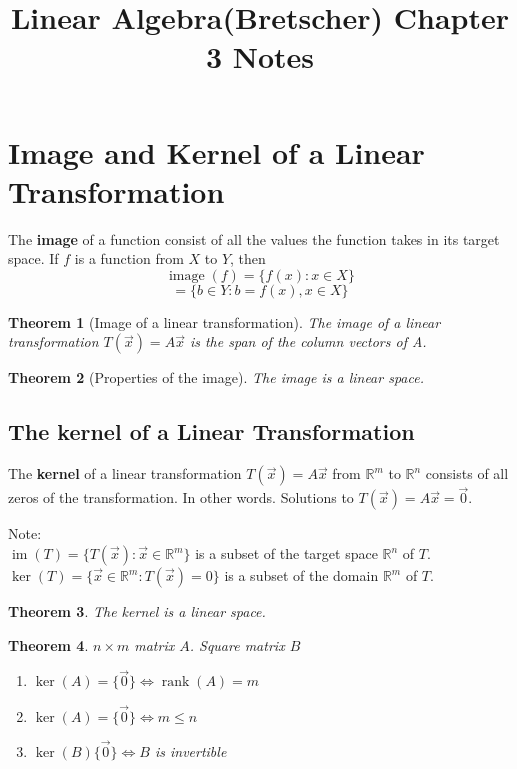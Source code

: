 \documentclass[letter]{article}
\title{Linear Algebra(Bretscher) Chapter 3 Notes}
\date{}
\newcommand{\R}{\mathbb{R}}
\newcommand{\im}{\operatorname{im}}
\newcommand{\image}{\operatorname{image}}
\newcommand{\rank}{\operatorname{rank}}
\newtheorem{theorem}{Theorem}[section]
\newenvironment{definition}[1][Definition]{\begin{trivlist}
\item[\hskip \labelsep {\bfseries #1}]}{\end{trivlist}}
\begin{document}
\maketitle
\vspace{-.5in}

\section{Image and Kernel of a Linear Transformation}
\begin{definition}
The \textbf{image} of a function consist of all the values the function takes in its target space. If $f$ is a function from $X$ to $Y$, then
\[ \image (f) = \{f(x): x \in X\} \]
\[ = \{b \in Y:  b = f(x), x\in X\} \]
\end{definition}

\begin{theorem}[Image of a linear transformation]
The image of a linear transformation $T(\vec x) = A\vec x$ is the span of the column vectors of A.
\end{theorem}

\begin{theorem}[Properties of the image]
The image is a linear space.
\end{theorem}

\subsection{The kernel of a Linear Transformation}
\begin{definition}
The \textbf{kernel} of a linear transformation $T(\vec x) = A \vec x$ from $\R^m$ to $\R^n$ consists of all zeros of the transformation. In other words. Solutions to $T(\vec x) = A \vec x = \vec 0$.
\end{definition}

Note:\\
$\im(T) = \{T(\vec x) : \vec x \in \R^m\}$ is a subset of the target space $\R^n$ of $T$.\\
$\ker(T)=\{\vec x \in \R^m : T(\vec x) = 0\}$ is a subset of the domain $\R^m$ of $T$.\\

\begin{theorem}
The kernel is a linear space.
\end{theorem}

\begin{theorem}
 $n \times m$ matrix $A$. Square matrix $B$\\
\begin{enumerate}
\item $\ker(A) = \{\vec 0\} \Leftrightarrow \rank(A) = m$
\item $\ker(A) = \{\vec 0\} \Leftrightarrow m \leq n$
\item $\ker(B) \{\vec 0\} \Leftrightarrow B$ is invertible
\end{enumerate}
\end{theorem}
\end{document}
